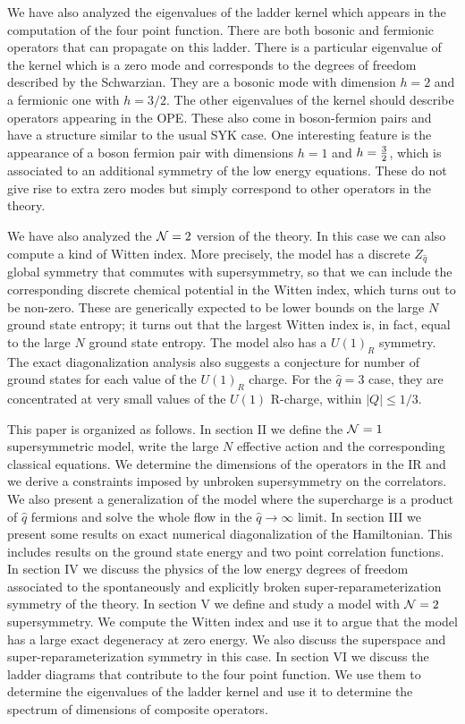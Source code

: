 \documentclass[aps,pre,preprint,onecolumn,citeautoscript,superscriptaddress,nofootinbib,eqsecnum]{revtex4-1}
\begin{document}
 We have also analyzed the  eigenvalues of the ladder kernel which appears in the computation of the four point function. There are both bosonic and fermionic
 operators that can propagate on this ladder. There is a particular eigenvalue of the kernel which is a zero mode and corresponds to the degrees of freedom 
 described by the Schwarzian. They are a bosonic mode with dimension $h=2$ and a fermionic one with $h=3/2$. The other eigenvalues of the kernel should 
 describe operators appearing in the OPE. These also come in boson-fermion pairs and have a structure similar to the usual SYK case. One interesting feature is
 the appearance of a boson fermion pair with dimensions $h=1$ and $h= {3 \over 2 }$, which is associated to an additional 
  symmetry of the low energy equations. These do not give rise to extra zero modes but simply correspond  to other operators in the theory.  
 
   We have also analyzed the ${\cal N}=2$ version of the theory. In this case we can also compute a kind of Witten index. More precisely, the model has  a 
 discrete $Z_{\hat q }$ global symmetry that commutes with supersymmetry, so that we can include the corresponding discrete chemical potential in the Witten index, 
 which turns out to be non-zero. These are generically expected to be lower bounds on the large $N$ ground state entropy; it turns out that the largest Witten index is, 
 in fact, equal to the large $N$ ground state entropy. The model also has a $U(1)_R$ symmetry. 
 The exact diagonalization analysis also suggests a conjecture for number of ground states for each value of the   $U(1)_R$ charge. For the $\hat q=3$ case, they
 are concentrated at very small values of the $U(1)$ R-charge, within $|Q|\leq 1/3 $. 
  
     
   This paper is organized as follows. In section II we define the ${\cal N}=1$ supersymmetric model, write the large $N$ effective action and  the corresponding 
   classical equations.  We determine the dimensions of the operators in the IR and we derive a  constraints imposed by unbroken supersymmetry on the 
   correlators. We also present a generalization of the model where the supercharge is a product of $\hat q$ fermions and solve the whole flow in the $\hat q \to \infty $ 
   limit. In section III we present some results on exact numerical diagonalization of the Hamiltonian. This includes results on the ground state energy and two point correlation functions. In section IV we discuss the physics of the low energy  degrees of freedom associated to the spontaneously and explicitly broken super-reparameterization symmetry of the theory. In section V we define and study a model with ${\cal N}=2$ supersymmetry. We compute the Witten index and use it to argue that the model has a large exact degeneracy at zero energy. We also discuss the superspace and super-reparameterization symmetry in this case. 
    In section VI we discuss the ladder  diagrams that contribute to the four point function. We use them to determine the eigenvalues of the ladder kernel and use it
    to determine the spectrum of dimensions of composite  operators. 
    
\end{document}
